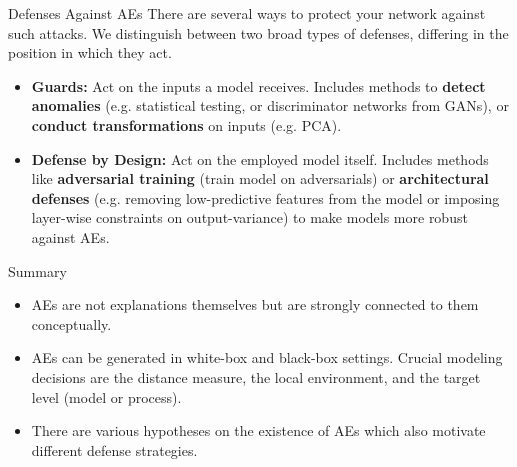 \documentclass[11pt,compress,t,notes=noshow, xcolor=table]{beamer}
\begin{document}
\begin{vbframe}{Defenses Against AEs}
There are several ways to protect your network against such attacks. We distinguish between two broad types of defenses, differing in the position in which they act.
\begin{itemize}
    \item \textbf{Guards:} Act on the inputs a model receives. Includes methods to \textbf{detect anomalies} (e.g. statistical testing, or discriminator networks from GANs), or \textbf{conduct transformations} on inputs (e.g. PCA).
    \item \textbf{Defense by Design:} Act on the employed model itself. Includes methods like \textbf{adversarial training} (train model on adversarials) or \textbf{architectural defenses} (e.g. removing low-predictive features from the model or imposing layer-wise constraints on output-variance) to make models more robust against AEs.
\end{itemize}
\end{vbframe}


\begin{vbframe}{Summary}
\begin{itemize}
    \item AEs are not explanations themselves but are strongly connected to them conceptually.
    \item AEs can be generated in white-box and black-box settings. Crucial modeling decisions are the distance measure, the local environment, and the target level (model or process).
    \item There are various hypotheses on the existence of AEs which also motivate different defense strategies.
\end{itemize}
\end{vbframe}
\end{document}
